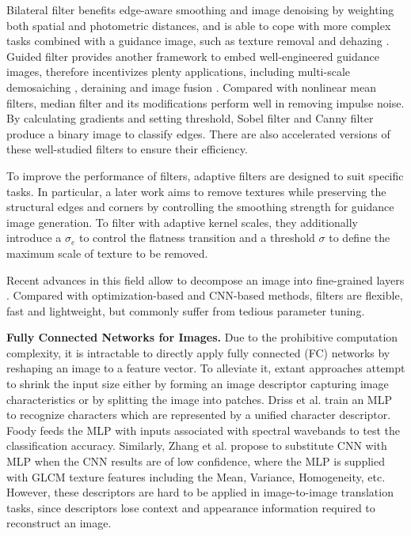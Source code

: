 \documentclass[twocolumn]{svjour3}          %
\begin{document}
Bilateral filter \cite{Tomasi1998} benefits edge-aware smoothing and image denoising by weighting both spatial and photometric distances, and is able to cope with more complex tasks combined with a guidance image, such as texture removal \cite{RGF,Cho2013_BTF} and dehazing \cite{JBF_dehaze}. Guided filter \cite{GuidedFil} provides another framework to embed well-engineered guidance images, therefore incentivizes plenty applications, including multi-scale demosaiching \cite{guidedfil_demosaiching}, deraining \cite{Zheng2013_derain} and image fusion \cite{guidedfil_imagefusion}. Compared with nonlinear mean filters, median filter and its modifications \cite{median_adaptive,ac3} perform well in removing impulse noise. By calculating gradients and setting threshold, Sobel filter \cite{sobelfil} and Canny filter \cite{canny_fast} produce a binary image to classify edges. There are also accelerated versions of these well-studied filters \cite{BF_ac1,guidedfil_ac,ac4,ac3,ac2} to ensure their efficiency.

To improve the performance of filters, adaptive filters \cite{Foi2007,Jeon2016,median_adaptive} are designed to suit specific tasks. In particular, a later work \cite{Jeon2016} aims to remove textures while preserving the structural edges and corners by controlling the smoothing strength for guidance image generation. To filter with adaptive kernel scales, they additionally introduce a $\sigma_{e}$ to control the flatness transition and a threshold $\sigma$ to define the maximum scale of texture to be removed.

Recent advances in this field allow to decompose an image into fine-grained layers \cite{filrec1,filrec2,filrec3,Cho2013_BTF}. Compared with optimization-based and CNN-based methods, filters are flexible, fast and lightweight, but commonly suffer from tedious parameter tuning.

\textbf{Fully Connected Networks for Images.}
Due to the prohibitive computation complexity, it is intractable to directly apply fully connected (FC) networks by reshaping an image to a feature vector. To alleviate it, extant approaches attempt to shrink the input size either by forming an image descriptor capturing image characteristics or by splitting the image into patches. Driss et al. \cite{MLP_descriptor} train an MLP to recognize characters which are represented by a unified character descriptor. Foody \cite{MLP_descriptor2} feeds the MLP with inputs associated with spectral wavebands to test the classification accuracy. Similarly, Zhang et al. \cite{CNN_MLP1} propose to substitute CNN with MLP when the CNN results are of low confidence, where the MLP is supplied with GLCM texture features including the Mean, Variance, Homogeneity, etc. However, these descriptors are hard to be applied in image-to-image translation tasks, since descriptors lose context and appearance information required to reconstruct an image.
\end{document}
